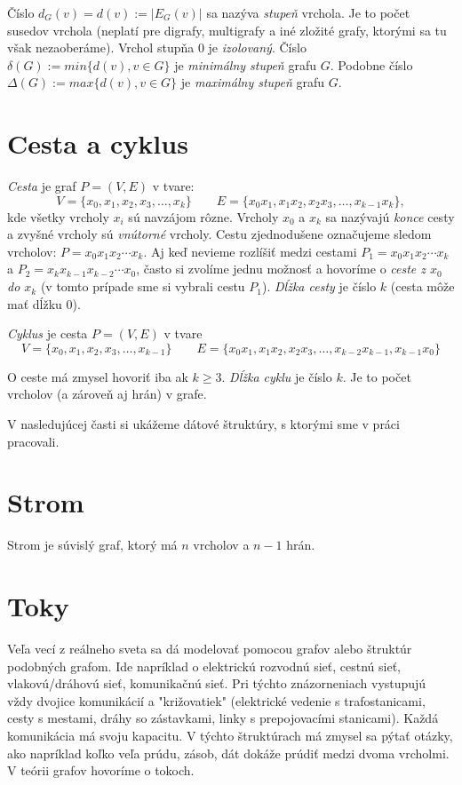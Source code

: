 Číslo $d_G(v) = d(v) := |E_G(v)|$ sa nazýva \emph{stupeň} vrchola. Je to počet 
susedov vrchola (neplatí pre digrafy, multigrafy a iné zložité grafy, ktorými 
sa tu však nezaoberáme). Vrchol stupňa $0$ je \emph{izolovaný}. Číslo $\delta 
(G) := min \{d(v), v \in G\}$ je \emph{minimálny stupeň} grafu $G$. Podobne 
číslo $\Delta (G) := max \{d(v), v \in G\}$ je \emph{maximálny stupeň} grafu 
$G$.

\section{Cesta a cyklus}

\emph{Cesta} je graf $P = (V, E)$ v tvare: 
$$ V = \{x_0, x_1, x_2, x_3, \ldots, x_k\} \qquad 
   E = \{x_0x_1, x_1x_2, x_2x_3, \ldots, x_{k-1}x_k\},$$
kde všetky vrcholy $x_i$ sú navzájom rôzne. Vrcholy $x_0$ a $x_k$ sa nazývajú 
\emph{konce} cesty a zvyšné vrcholy sú \emph{vnútorné} vrcholy. Cestu 
zjednodušene označujeme sledom vrcholov: $P = x_0x_1x_2\cdots x_k$. Aj keď 
nevieme rozlíšiť medzi cestami $P_1 = x_0x_1x_2\cdots x_k$ a 
$P_2 = x_kx_{k-1}x_{k-2}\cdots x_0$, často si zvolíme jednu možnosť a hovoríme 
o \emph{ceste z $x_0$ do $x_k$} (v tomto prípade sme si vybrali cestu $P_1$). 
\emph{Dĺžka cesty} je číslo $k$ (cesta môže mať dĺžku 0).

\emph{Cyklus} je cesta $P = (V, E)$ v tvare 
$$ V = \{ x_0, x_1, x_2, x_3, \ldots, x_{k-1}\} \qquad 
E = \{x_0x_1, x_1x_2, x_2x_3, \ldots, x_{k-2}x_{k-1}, x_{k-1}x_0\}$$

O ceste má zmysel hovoriť iba ak $k \geq 3$. \emph{Dĺžka cyklu} je číslo $k$. 
Je to počet vrcholov (a zároveň aj hrán) v grafe.

V nasledujúcej časti si ukážeme dátové štruktúry, s ktorými sme v práci 
pracovali.

\section{Strom}

Strom je súvislý graf, ktorý má $n$ vrcholov a $n-1$ hrán.


\section{Toky}

Veľa vecí z reálneho sveta sa dá modelovať pomocou grafov alebo štruktúr 
podobných grafom. Ide napríklad o elektrickú rozvodnú sieť, cestnú sieť, 
vlakovú/dráhovú sieť, komunikačnú sieť. Pri týchto znázorneniach vystupujú 
vždy dvojice komunikácií a "križovatiek" (elektrické vedenie s trafostanicami, 
cesty s mestami, dráhy so zástavkami, linky s prepojovacími stanicami). Každá 
komunikácia má svoju kapacitu. V týchto štruktúrach má zmysel sa pýtať otázky, 
ako napríklad koľko veľa prúdu, zásob, dát dokáže prúdiť medzi dvoma vrcholmi. 
V teórii grafov hovoríme o tokoch. 

